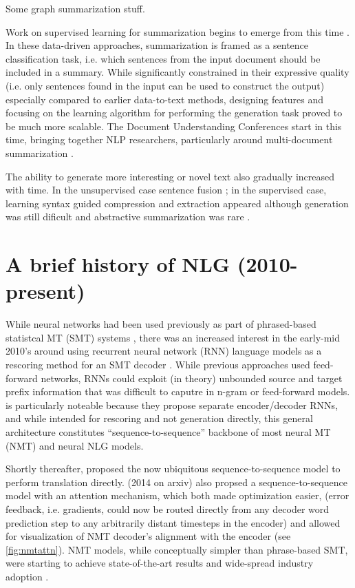 Some graph summarization  stuff.

Work on supervised learning for summarization begins to emerge from this
time \citep{kupiec1995trainable,osborne2002using,hirao2002extracting}. In these data-driven approaches, summarization
is framed as a sentence classification task, i.e. which sentences from the
input document should be included in a summary. While significantly constrained
in their expressive quality (i.e. only sentences found in the input can be
used to construct the output) especially compared to earlier data-to-text methods, designing features and focusing on the learning algorithm for performing
the generation task proved to be much more scalable. 
The Document Understanding Conferences start in this time, bringing together 
NLP researchers, particularly around multi-document summarization \cite{duc}.

The ability to generate more interesting or novel text also gradually increased
with time. In the unsupervised case sentence fusion \cite{fusion};
in the supervised case, learning syntax guided compression and extraction
appeared \cite{} although generation was still dificult and abstractive summarization was rare \cite{maybemckeownnenkova}.



\section{A brief history of NLG (2010-present)}

While neural networks had been used previously as part of phrased-based 
statistcal MT (SMT) systems \cite{}, there was an increased interest in
the early-mid 2010's around using recurrent neural network (RNN) language 
models \citep{miklov}
as a rescoring method for an SMT decoder \citep{auli2013joint,cho2014learning}.
While previous approaches 
used feed-forward networks, RNNs could exploit (in theory) unbounded source
and target prefix information that was difficult to caputre in n-gram or 
feed-forward models. \citet{cho2014learning} is particularly noteable because
they propose separate encoder/decoder RNNs, and while intended for rescoring
and not generation directly, this general architecture 
constitutes ``sequence-to-sequence'' backbone of most neural MT (NMT) and 
neural NLG models.

Shortly thereafter, \citet{sutskever2014sequence} proposed the now ubiquitous 
sequence-to-sequence model to perform translation directly. \citet{bahdanau2015neural} (2014 on arxiv) also propsed a sequence-to-sequence model with 
an attention mechanism, which both made optimization easier, (error feedback,
 i.e. gradients, could now be routed directly from any decoder word prediction 
 step to
 any arbitrarily  distant timesteps in the encoder)
 and allowed for visualization of NMT decoder's alignment with the encoder
 (see \autoref{fig:nmtattn}).
NMT models, while conceptually simpler than phrase-based SMT, were starting
to achieve state-of-the-art results \cite{} and wide-spread industry adoption
\cite{wu2016google}.

